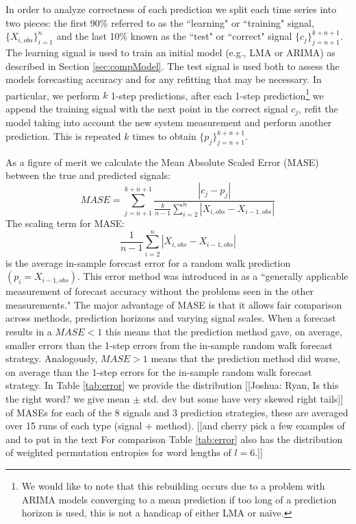 In order to analyze correctness of each prediction we split each time series into two pieces: the first 90\% referred to as the ``learning" or ``training" signal, $\{X_{i,obs}\}_{i=1}^{n}$ and the last 10\% known as the ``test" or ``correct" signal $\{c_j\}_{j=n+1}^{k+n+1}$. The learning signal is used to train an initial model (e.g., LMA or ARIMA) as described in Section \ref{sec:compModel}. The test signal is used both to assess the models forecasting accuracy and for any refitting that may be necessary. In particular, we perform $k$ 1-step predictions, after each 1-step prediction\footnote{We would like to note that this rebuilding occurs due to a problem with ARIMA models converging to a mean prediction if too long of a prediction horizon is used, this is not a handicap of either LMA or na\"ive.} we append the training signal with the next point in the correct signal $c_j$, refit the model taking into account the new system measurement and perform another prediction. This is repeated $k$ times to obtain $\{p_j\}_{j=n+1}^{k+n+1}$.

As a figure of merit we calculate the Mean Absolute Scaled Error (MASE)\cite{MASE} between the true and predicted signals: 
$$MASE = \sum_{j=n+1}^{k+n+1}\frac{|c_j-p_j| }{\frac{k}{n-1}\sum^n_{i=2}|X_{i,obs}-X_{i-1,obs}|}$$
The scaling term for MASE:
$$\frac{1}{n-1}\sum^n_{i=2}|X_{i,obs}-X_{i-1,obs}|$$ 
is the average in-sample forecast error for a random walk prediction $(p_i=X_{i-1,obs})$. This error method was introduced in \cite{MASE} as a ``generally applicable measurement of forecast accuracy without the problems seen in the other measurements." The major advantage of MASE is that it allows fair comparison across methods, prediction horizons and varying signal scales. When a forecast results in a $MASE<1$ this means that the prediction method gave, on average, smaller errors than the 1-step errors from the in-sample random walk forecast strategy. Analogously, $MASE>1$ means that the prediction method did worse, on average than the 1-step errors for the in-sample random walk forecast strategy. In Table \ref{tab:error} we provide the distribution [[Joshua: Ryan, Is this the right word? we give mean $\pm$ std. dev but some have very skewed right tails]]  of MASEs for each of the 8 signals and 3 prediction strategies, these are averaged over 15 runs of each type (signal + method). [[and cherry pick a few examples of \gcc and \col to put in the text For comparison Table \ref{tab:error} also has the distribution of weighted permutation entropies for word lengths of $l=6$.]]








